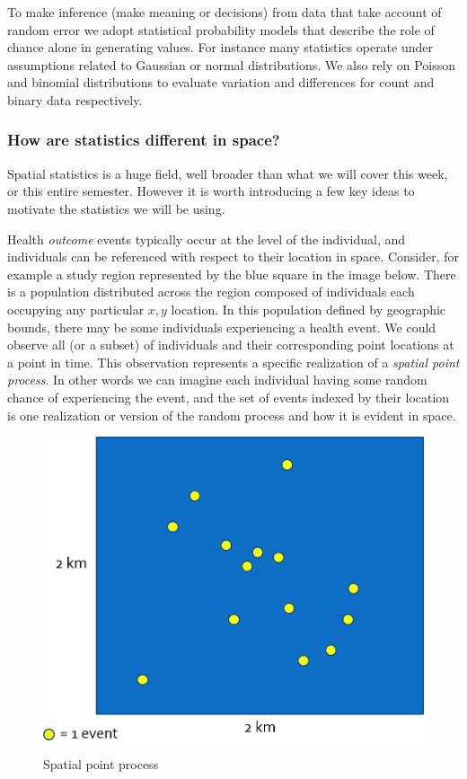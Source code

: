 \documentclass[
]{book}
\begin{document}
To make inference (make meaning or decisions) from data that take account of random error we adopt statistical probability models that describe the role of chance alone in generating values. For instance many statistics operate under assumptions related to Gaussian or normal distributions. We also rely on Poisson and binomial distributions to evaluate variation and differences for count and binary data respectively.

\hypertarget{how-are-statistics-different-in-space}{%
\subsubsection{How are statistics different in space?}\label{how-are-statistics-different-in-space}}

Spatial statistics is a huge field, well broader than what we will cover this week, or this entire semester. However it is worth introducing a few key ideas to motivate the statistics we will be using.

Health \emph{outcome} events typically occur at the level of the individual, and individuals can be referenced with respect to their location in space. Consider, for example a study region represented by the blue square in the image below. There is a population distributed across the region composed of individuals each occupying any particular \(x,y\) location. In this population defined by geographic bounds, there may be some individuals experiencing a health event. We could observe all (or a subset) of individuals and their corresponding point locations at a point in time. This observation represents a specific realization of a \emph{spatial point process}. In other words we can imagine each individual having some random chance of experiencing the event, and the set of events indexed by their location is one realization or version of the random process and how it is evident in space.

\begin{figure}
\centering
\includegraphics{images/point-process.png}
\caption{\label{fig:unnamed-chunk-4}Spatial point process}
\end{figure}
\end{document}

